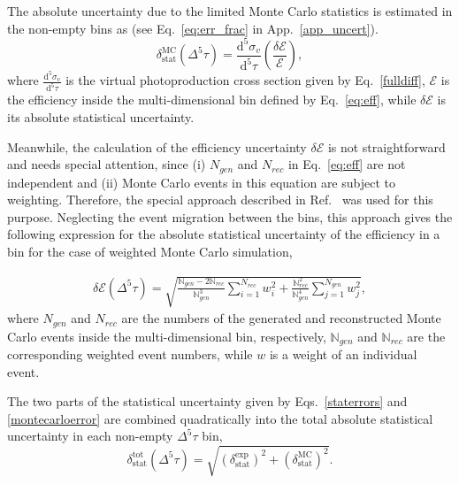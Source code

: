 
The absolute uncertainty due to the limited Monte Carlo statistics is estimated in the non-empty bins as (see Eq.~\eqref{eq:err_frac} in App.~\ref{app_uncert}).\vspace{-0.25em}
\begin{equation}
\delta_{\text{stat}}^{\text{MC}}(\Delta^{5} \tau) = \frac{\textrm{d}^{5}\sigma_{v}}{\textrm{d}^{5}\tau} \left( \frac{\delta \mathcal{E}}{\mathcal{E}} \right),
\label{montecarloerror}
\end{equation}
where $\frac{\textrm{d}^{5}\sigma_{v}}{\textrm{d}^{5}\tau}$ is the virtual photoproduction cross section given by Eq.~\eqref{fulldiff}, $\mathcal{E}$ is the efficiency inside the multi-dimensional bin defined by Eq.~\eqref{eq:eff}, while $\delta \mathcal{E}$ is its absolute statistical uncertainty. 


Meanwhile, the calculation of the efficiency uncertainty $\delta \mathcal{E}$ is not straightforward and needs special attention, since (i) $N_{gen}$ and $N_{rec}$ in Eq.~\eqref{eq:eff} are not independent and (ii) Monte Carlo events in this equation are subject to weighting. Therefore, the special approach described in Ref.~\cite{Laforge:1996ts} was used for this purpose. Neglecting the event migration between the bins, this approach gives the following expression for the absolute statistical uncertainty of the efficiency in a bin for the case of weighted Monte Carlo simulation,



\begin{equation}
\begin{aligned}
\delta \mathcal{E}(\Delta^{5} \tau) = \sqrt{\frac{\mathbb{N}_{gen} - 2\mathbb{N}_{rec}}{\mathbb{N}_{gen}^{3}}\sum\limits_{i=1}^{N_{rec}} w_{i}^{2} + \frac{\mathbb{N}_{rec}^{2}}{\mathbb{N}_{gen}^{4}}\sum\limits_{j=1}^{N_{gen}} w_{j}^{2}},
\end{aligned}
\label{eq:eff_err_weighted}
\end{equation}
where $N_{gen}$ and $N_{rec}$ are the numbers of the generated and reconstructed Monte Carlo events inside the multi-dimensional bin, respectively, $\mathbb{N}_{gen}$ and  $\mathbb{N}_{rec}$ are the corresponding weighted event numbers, while $w$ is a weight of an individual event.


The two parts of the statistical uncertainty given by Eqs.~\eqref{staterrors} and \eqref{montecarloerror} are combined quadratically into the total absolute statistical uncertainty in each non-empty $\Delta^{5} \tau$ bin,
\begin{equation}
\delta_{\text{stat}}^{\text{tot}}(\Delta^{5} \tau) =
\sqrt{\left (\delta_{\text{stat}}^{\text{exp}} \right )^{2} + \left (\delta_{\text{stat}}^{\text{MC}}\right )^{2}}.
\label{errortot}
\end{equation}


